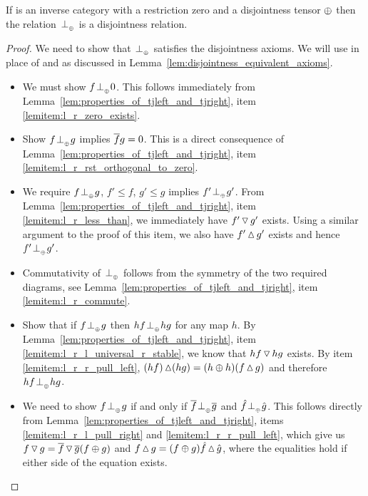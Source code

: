 \begin{lemma}\label{lem:tensor_disjointness_is_disjointness}
  If \X is an inverse category with a restriction zero and a disjointness tensor $\oplus$ then
  the relation ${}_{{}_{}}{\perp_{{}_{\oplus}}}$ is a disjointness relation.
\end{lemma}
\begin{proof}
  We need to show that ${}_{{}_{}}{\perp_{{}_{\oplus}}}$ satisfies the disjointness axioms. We will use  in
  place of  and  as discussed in
  Lemma~\ref{lem:disjointness_equivalent_axioms}.
  \begin{itemize}
    \item[\axiom{Dis}{1}] We must show $f {}_{{}_{}}{\perp_{{}_{\oplus}}} 0$. This follows immediately from
      Lemma~\ref{lem:properties_of_tjleft_and_tjright}, item \ref{lemitem:l_r_zero_exists}.
    \item[\axiom{Dis}{2}] Show $f {}_{{}_{}}{\perp_{{}_{\oplus}}} g$ implies $\overline{f}g = 0$. This is a direct consequence of
      Lemma~\ref{lem:properties_of_tjleft_and_tjright}, item
      \ref{lemitem:l_r_rst_orthogonal_to_zero}.
    \item[\axiom{Dis}{3}] We require $f{}_{{}_{}}{\perp_{{}_{\oplus}}} g$, $f' \le f$, $g' \le g$ implies $f' {}_{{}_{}}{\perp_{{}_{\oplus}}} g'$.
      From Lemma~\ref{lem:properties_of_tjleft_and_tjright}, item \ref{lemitem:l_r_less_than}, we
      immediately have $f' \operatorname{\triangledown} g'$ exists. Using a similar argument to the proof of this item,
      we also have $f' \operatorname{\vartriangle} g'$ exists and hence $f' {}_{{}_{}}{\perp_{{}_{\oplus}}} g'$.
    \item[\axiom{Dis}{4}] Commutativity of ${}_{{}_{}}{\perp_{{}_{\oplus}}}$ follows from the symmetry of the two required
    diagrams, see Lemma~\ref{lem:properties_of_tjleft_and_tjright}, item
      \ref{lemitem:l_r_commute}.
    \item[\axiom{Dis}{5}] Show that if $f{}_{{}_{}}{\perp_{{}_{\oplus}}} g$ then $h f {}_{{}_{}}{\perp_{{}_{\oplus}}} h g$ for any map $h$.
      By  Lemma~\ref{lem:properties_of_tjleft_and_tjright}, item
      \ref{lemitem:l_r_l_universal_r_stable}, we know that $h f \operatorname{\triangledown} h g$ exists.
      By item \ref{lemitem:l_r_r_pull_left},  $(h f)\operatorname{\vartriangle} (h g) = (h \oplus h) (f\operatorname{\vartriangle} g)$
      and therefore $h f {}_{{}_{}}{\perp_{{}_{\oplus}}} h g$.
    \item[\axiom{Dis}{6'}] We need to show $f{}_{{}_{}}{\perp_{{}_{\oplus}}} g$ if and only if $\overline{f} {}_{{}_{}}{\perp_{{}_{\oplus}}} \overline{g}$ and
      $\hat{f}{}_{{}_{}}{\perp_{{}_{\oplus}}} \hat{g}$. This follows directly from
      Lemma~\ref{lem:properties_of_tjleft_and_tjright}, items
      \ref{lemitem:l_r_l_pull_right} and       \ref{lemitem:l_r_r_pull_left}, which give us
      $f\operatorname{\triangledown} g = \overline{f}\operatorname{\triangledown} \overline{g} (f\oplus g)$ and
      $f\operatorname{\vartriangle} g = (f \oplus g)\hat{f}\operatorname{\vartriangle} \hat{g}$, where the equalities hold if either side of
      the equation exists.
  \end{itemize}
\end{proof}


